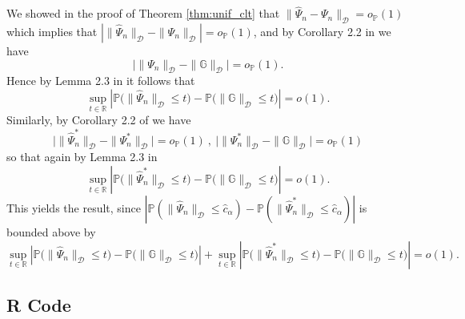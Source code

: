 \documentclass[12pt]{article}
\newcommand{\Pb}{\mathbb{P}}
\newcommand{\Gb}{\mathbb{G}}
\newcommand{\R}{\mathbb{R}}
\theoremstyle{remark}
\begin{document}
We showed in the proof of Theorem \ref{thm:unif_clt} that $ \| \widehat\Psi_n  - \Psi_n \|_\mathcal{D} = o_\Pb(1) $ which implies that
 $| \| \widehat\Psi_n \|_\mathcal{D} - \| \Psi_n \|_\mathcal{D} | = o_\Pb(1)$, 
and by Corollary 2.2 in \textcite{chernozhukov2014gaussian} we have
$$ \Big| \| \Psi_n \|_\mathcal{D} - \| \Gb \|_\mathcal{D} \Big| = o_\Pb(1) . $$
Hence by Lemma 2.3 in  \textcite{chernozhukov2014gaussian} it follows that
$$ \sup_{t \in \R} \left| \Pb\Big( \| \widehat\Psi_n \|_\mathcal{D} \leq t \Big) - \Pb\Big( \| \Gb \|_\mathcal{D} \leq t \Big) \right| = o(1) . $$
Similarly, by Corollary 2.2 of \textcite{belloni2015uniformly} we have
$$ \Big| \| \widehat\Psi^*_n \|_\mathcal{D}  - \| \Psi^*_n \|_\mathcal{D} \Big| = o_\Pb(1) \ , \  \Big| \| \Psi^*_n \|_\mathcal{D} - \| \Gb \|_\mathcal{D} \Big| = o_\Pb(1) $$
so that again by Lemma 2.3 in  \textcite{chernozhukov2014gaussian}
$$ \sup_{t \in \R} \left| \Pb\Big( \| \widehat\Psi^*_n \|_\mathcal{D} \leq t \Big) - \Pb\Big( \| \Gb \|_\mathcal{D} \leq t \Big) \right| = o(1). $$
This yields the result, since $| \Pb(  \| \widehat\Psi_n \|_\mathcal{D} \leq \hat{c}_\alpha ) - \Pb(  \| \widehat\Psi^*_n \|_\mathcal{D} \leq \hat{c}_\alpha ) | $ is bounded above by
$$ \sup_{t \in \R} \left| \Pb\Big( \| \widehat\Psi_n \|_\mathcal{D} \leq t \Big) - \Pb\Big( \| \Gb \|_\mathcal{D} \leq t \Big) \right| +  \sup_{t \in \R} \left| \Pb\Big( \| \widehat\Psi^*_n \|_\mathcal{D} \leq t \Big) - \Pb\Big( \| \Gb \|_\mathcal{D} \leq t \Big) \right| = o(1) . $$

\pagebreak
\subsection{R Code}
\label{sec:code}

\bigskip
\end{document}
